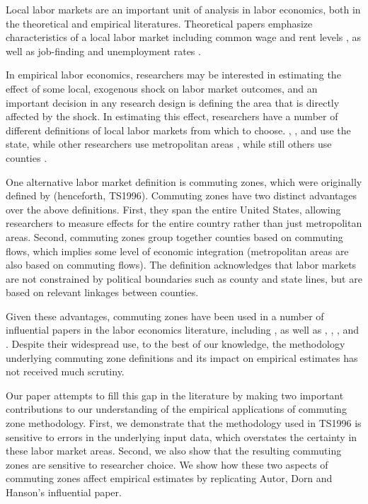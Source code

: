 Local labor markets are an important unit of analysis in labor economics, both in the theoretical and empirical literatures. Theoretical papers emphasize characteristics of a local labor market including common wage and rent levels \citep{Roback1982,Moretti2011}, as well as job-finding and unemployment rates \citep{HL2012,SS2014}.

In empirical labor economics, researchers may be interested in estimating the effect of some local, exogenous shock on labor market outcomes, and an important decision in any research design is defining the area that is directly affected by the shock. In estimating this effect, researchers have a number of different definitions of local labor markets from which to choose. \citet{BK1992}, \citet{Wozniak2010}, and \citet{KW2011} use the state, while other researchers use metropolitan areas \citep{BH2000,Card2001,Notowidigdo2011,Diamond2016}, while still others use counties \citep{MRR2015,FGS2015}.

One alternative labor market definition is commuting zones, which were originally defined by \citet{TS1996} (henceforth, TS1996). Commuting zones have two distinct advantages over the above definitions. First, they span the entire United States, allowing researchers to measure effects for the entire country rather than just metropolitan areas. Second, commuting zones group together counties based on commuting flows, which implies some level of economic integration (metropolitan areas are also based on commuting flows). The definition acknowledges that labor markets are not constrained by political boundaries such as county and state lines, but are based on relevant linkages between counties. 


Given these advantages, commuting zones have been used in a number of influential papers in the labor economics literature, including \citet{ADH2013}, as well as \citet{ChettyHendrenKlineSaez2014}, \citet{AM2015}, \citet{Restrepo2015}, and \citet{Yagan2016}. Despite their widespread use, to the best of our knowledge, the methodology underlying commuting zone definitions and its impact on empirical estimates has not received much scrutiny. 

Our paper attempts to fill this gap in the literature by making two important contributions to our understanding of the empirical applications of commuting zone methodology. First, we demonstrate that the methodology used in TS1996 is sensitive to errors in the underlying input data, which overstates the certainty in these labor market areas. Second, we also show that the resulting commuting zones are sensitive to researcher choice. We show how these two aspects of commuting zones affect empirical estimates by replicating Autor, Dorn and Hanson's influential paper.

